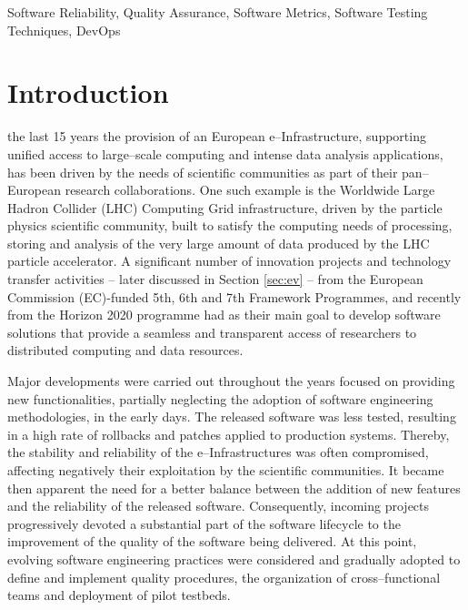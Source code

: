 \documentclass[journal]{IEEEtran}
\begin{document}
\begin{IEEEkeywords}
Software Reliability, Quality Assurance, Software Metrics, Software Testing
Techniques, DevOps
\end{IEEEkeywords}

\IEEEpeerreviewmaketitle

\section{Introduction}

 the last 15 years the provision of an European e--Infrastructure,
supporting unified access to large--scale computing and intense data analysis
applications, has been driven by the needs of scientific communities as part of their
pan--European research collaborations. One such example is the Worldwide
Large Hadron Collider (LHC) Computing Grid infrastructure, driven
by the particle physics scientific community, built to satisfy the computing needs
of processing, storing and analysis of the very large amount of data produced by the
LHC particle accelerator. A significant number of innovation projects and technology transfer
activities -- later discussed in Section \ref{sec:ev} -- from the European Commission
(EC)-funded 5th, 6th and 7th Framework Programmes, and recently from the Horizon 2020 programme
\cite{h2020} had as their main goal to develop software solutions that provide a seamless and
transparent access of researchers to distributed computing and data resources. 

Major developments were carried out throughout the years focused on providing new
functionalities, partially neglecting the adoption of software engineering methodologies, in the early days.
The released software was less tested, resulting in a high rate of
rollbacks and patches applied to production systems. Thereby, the stability and
reliability of the e--Infrastructures was often compromised, affecting
negatively their exploitation by the scientific communities.
It became then apparent the need for a better balance between the addition of new features
and the reliability of the released software. Consequently, incoming projects progressively
devoted a substantial part of the software lifecycle to the improvement of the quality of the
software being delivered. At this point, evolving software engineering practices were considered
and gradually adopted to define and implement quality procedures, the organization of
cross--functional teams and deployment of pilot testbeds.
\end{document}
